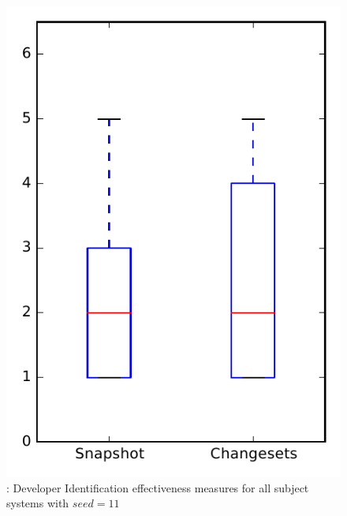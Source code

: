 
\begin{figure}
\centering
\includegraphics[height=0.4\textheight]{figures/dit_seed/rq1_overview_11}
\caption{\rtwo: Developer Identification effectiveness measures for all subject systems with $seed=11$}
\label{fig:dit_seed:rq1:overview}
\end{figure}
